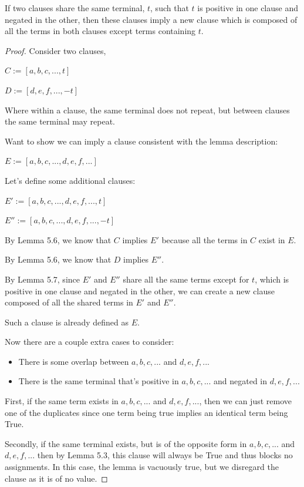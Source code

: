 \documentclass[manuscript]{acmart}
\begin{document}
    \begin{lemma}
        If two clauses share the same terminal, $t$, such that $t$ is positive in one clause and negated in the other, then these clauses imply a new clause which is composed of all the terms in both clauses except terms containing $t$.
    \end{lemma}
    \begin{proof}
        Consider two clauses, 

        $C := [a, b, c, ..., t]$
        
        $D := [d, e, f, ..., -t]$

        Where within a clause, the same terminal does not repeat, but between clauses the same terminal may repeat.

        Want to show we can imply a clause consistent with the lemma description:

        $E := [a, b, c, ..., d, e, f, ...]$

        Let's define some additional clauses:

        $E' := [a, b, c, ..., d, e, f, ..., t]$

        $E'' := [a, b, c, ..., d, e, f, ..., -t]$

        By Lemma 5.6, we know that $C$ implies $E'$ because all the terms in $C$ exist in $E$.

        By Lemma 5.6, we know that $D$ implies $E''$.

        By Lemma 5.7, since $E'$ and $E''$ share all the same terms except for $t$, which is positive in one clause and negated in the other, we can create a new clause composed of all the shared terms in $E'$ and $E''$.

        Such a clause is already defined as $E$.

        Now there are a couple extra cases to consider:
        
        \begin{itemize}
            \item There is some overlap between $a, b, c, ...$ and $d, e, f, ...$
            \item There is the same terminal that's positive in $a, b, c, ...$ and negated in $d, e, f, ...$
        \end{itemize}

        First, if the same term exists in $a, b, c, ...$ and $d, e, f, ...$, then we can just remove one of the duplicates since one term being true implies an identical term being True.

        Secondly, if the same terminal exists, but is of the opposite form in $a, b, c, ...$ and $d, e, f, ...$
        then by Lemma 5.3, this clause will always be True and thus blocks no assignments. In this case, the lemma is vacuously true, but we disregard the clause as it is of no value.
    \end{proof}
\end{document}

